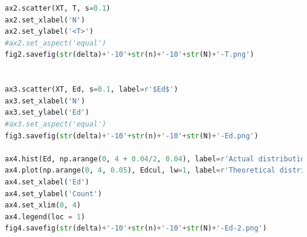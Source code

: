 \documentclass[a4paper,11pt]{article}
\begin{document}
\begin{appendices}
\begin{lstlisting}[language = python]
ax2.scatter(XT, T, s=0.1)
ax2.set_xlabel('N')
ax2.set_ylabel('<T>')
#ax2.set_aspect('equal')
fig2.savefig(str(delta)+'-10'+str(n)+'-10'+str(N)+'-T.png')


ax3.scatter(XT, Ed, s=0.1, label=r'$Ed$')
ax3.set_xlabel('N')
ax3.set_ylabel('Ed')
#ax3.set_aspect('equal')
fig3.savefig(str(delta)+'-10'+str(n)+'-10'+str(N)+'-Ed.png')

ax4.hist(Ed, np.arange(0, 4 + 0.04/2, 0.04), label=r'Actual distribution of $E_{d}$')  # DLA模拟结果散点图
ax4.plot(np.arange(0, 4, 0.05), Edcul, lw=1, label=r'Theoretical distribution of $E_{d}$')
ax4.set_xlabel('Ed')
ax4.set_ylabel('Count')
ax4.set_xlim(0, 4)
ax4.legend(loc = 1)
fig4.savefig(str(delta)+'-10'+str(n)+'-10'+str(N)+'-Ed-2.png')

\end{lstlisting}


\end{appendices}
\end{document}
